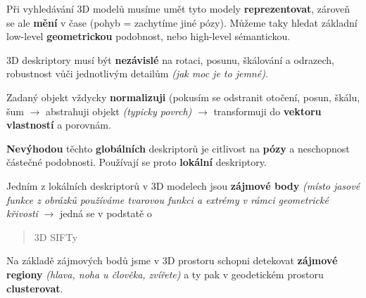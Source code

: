 Při vyhledávání 3D modelů musíme umět tyto modely \textbf{reprezentovat}, zároveň se ale \textbf{mění} v čase (pohyb = zachytíme jiné pózy). Můžeme taky hledat základní low-level \textbf{geometrickou} podobnost, nebo high-level sémantickou.

3D deskriptory musí být \textbf{nezávislé} na rotaci, posunu, škálování a odrazech, robustnost vůči jednotlivým detailům \textit{(jak moc je to jemné)}.

Zadaný objekt vždycky \textbf{normalizuji} (pokusím se odstranit otočení, posun, škálu, šum $\to$ abstrahuji objekt \textit{(typicky povrch)} $\to$ transformuji do \textbf{vektoru vlastností} a porovnám.

\textbf{Nevýhodou} těchto \textbf{globálních} deskriptorů je citlivost na \textbf{pózy} a neschopnost částečné podobnosti. Používají se proto \textbf{lokální} deskriptory.

Jedním z lokálních deskriptorů v 3D modelech jsou \textbf{zájmové body} \textit{(místo jasové funkce z obrázků používáme tvarovou funkci a extrémy v rámci geometrické křivosti} $\to$ jedná se v podstatě o \blockquote{3D SIFTy}.

Na základě zájmových bodů jsme v 3D prostoru schopni detekovat \textbf{zájmové regiony} \textit{(hlava, noha u člověka, zvířete)} a ty pak v geodetickém prostoru \textbf{clusterovat}.
